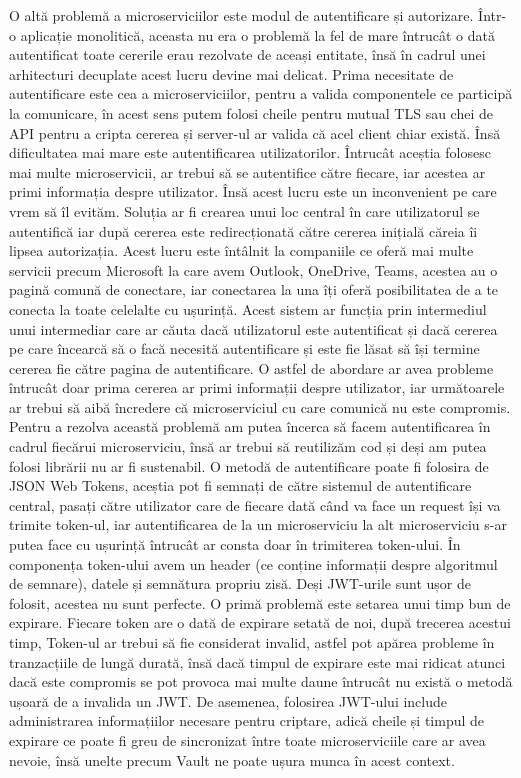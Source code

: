 O altă problemă a microserviciilor este modul de autentificare și autorizare. Într-o aplicație monolitică,
aceasta nu era o problemă la fel de mare întrucât o dată autentificat toate cererile erau rezolvate
de aceași entitate, însă în cadrul unei arhitecturi decuplate acest lucru devine mai delicat.
Prima necesitate de autentificare este cea a microserviciilor, pentru a valida componentele
ce participă la comunicare, în acest sens putem folosi cheile pentru mutual TLS sau
chei de API pentru a cripta cererea și server-ul ar valida că acel client chiar există.
Însă dificultatea mai mare este autentificarea utilizatorilor. Întrucât aceștia folosesc mai multe
microservicii, ar trebui să se autentifice către fiecare, iar acestea ar primi informația despre utilizator.
Însă acest lucru este un inconvenient pe care vrem să îl evităm. Soluția ar fi crearea unui loc
central în care utilizatorul se autentifică iar după cererea este redirecționată către cererea
inițială căreia îi lipsea autorizația. Acest lucru este întâlnit la companiile ce oferă mai multe
servicii precum Microsoft la care avem Outlook, OneDrive, Teams, acestea au o pagină comună
de conectare, iar conectarea la una îți oferă posibilitatea de a te conecta la toate celelalte
cu ușurință. Acest sistem ar funcția prin intermediul unui intermediar care ar căuta dacă
utilizatorul este autentificat și dacă cererea pe care încearcă să o facă necesită autentificare și
este fie lăsat să își termine cererea fie către pagina de autentificare. O astfel de abordare
ar avea probleme întrucât doar prima cererea ar primi informații despre utilizator, iar
următoarele ar trebui să aibă încredere că microserviciul cu care comunică nu este compromis.
Pentru a rezolva această problemă am putea încerca să facem autentificarea în cadrul fiecărui microserviciu,
însă ar trebui să reutilizăm cod și deși am putea folosi librării nu ar fi sustenabil. O metodă
de autentificare poate fi folosira de JSON Web Tokens, aceștia pot fi semnați de către
sistemul de autentificare central, pasați către utilizator care de fiecare dată când va face un request
își va trimite token-ul, iar autentificarea de la un microserviciu la alt microserviciu s-ar putea
face cu ușurință întrucât ar consta doar în trimiterea token-ului. În componența token-ului
avem un header (ce conține informații despre algoritmul de semnare), datele și semnătura
propriu zisă. Deși JWT-urile sunt ușor de folosit, acestea nu sunt perfecte. O primă problemă
este setarea unui timp bun de expirare. Fiecare token are o dată de expirare setată de noi,
după trecerea acestui timp, Token-ul ar trebui să fie considerat invalid, astfel pot apărea
probleme în tranzacțiile de lungă durată, însă dacă timpul de expirare este mai ridicat
atunci dacă este compromis se pot provoca mai multe daune întrucât nu există o metodă ușoară
de a invalida un JWT. De asemenea, folosirea JWT-ului include administrarea informațiilor
necesare pentru criptare, adică cheile și timpul de expirare ce poate fi greu de sincronizat
între toate microserviciile care ar avea nevoie, însă unelte precum Vault ne poate ușura munca
în acest context.
